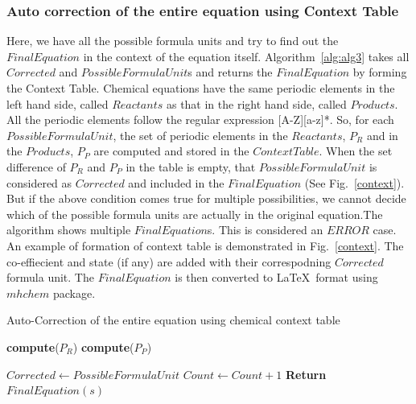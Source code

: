 \documentclass[conference]{IEEEtran}
\begin{document}
\subsubsection{Auto correction of the entire equation using Context Table}
Here, we have all the possible formula units and try to find out the $FinalEquation$ in the context of the equation itself. Algorithm~\ref{alg:alg3} takes all $Corrected$ and $PossibleFormulaUnit$s and returns the $FinalEquation$ by forming the Context Table. 
Chemical equations have the same periodic elements in the left hand side, called $Reactants$ as that in the right hand side, called $Products$. All the periodic elements follow the regular expression [A-Z][a-z]*. So, for each  $PossibleFormulaUnit$, the set of periodic elements in the $Reactants$, $P_{R}$ and in the $Products$, $P_{P}$ are computed and stored in the $Context Table$. When the set difference of $P_{R}$ and $P_{P}$ in the table is empty, that $PossibleFormulaUnit$ is considered as $Corrected$ and included in the $FinalEquation$ (See Fig.~\ref{context}). But if the above condition comes true for multiple possibilities, we cannot decide which of the possible formula units are actually in the original equation.The algorithm shows multiple $FinalEquation$s. This is considered an $ERROR$ case.
An example of formation of context table is demonstrated in  Fig.~\ref{context}. The co-effiecient and state (if any) are added with their correspodning $Corrected$ formula unit. The $FinalEquation$ is then converted to \LaTeX\  format using $mhchem$ package.

\begin{algorithm}
\small
\caption{Auto-Correction of the entire equation using chemical context table}
\begin{algorithmic}[1]
		\State \textbf{compute}($P_{R}$)  
		\Statex {}
		\State \textbf{compute}($P_{P}$)  \
		\Statex {}
		
			\State $Corrected \leftarrow PossibleFormulaUnit$
			\State $Count \leftarrow Count + 1$
		\EndIf
	\EndFor
		\Statex {}
	\EndIf
	\State  \textbf{Return} {$FinalEquation(s)$}
\EndProcedure
\end{algorithmic}
\label{alg:alg3}
\end{algorithm}
\end{document}
